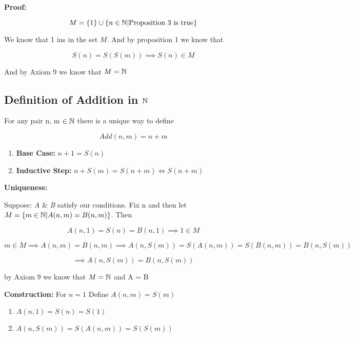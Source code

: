 \textbf{Proof:}

\[
	M = \{1\} \cup\{n \in \mathbb{N} | \text{Proposition 3 is true}\}
\]

We know that 1 ins in the set \(M\). And by proposition 1 we know that

\[
	S(n) = S(S(m)) \implies S(n) \in M
\]

And by Axiom 9 we know that \(M = \mathbb{N}\)

\subsection{Definition of Addition in \texorpdfstring{\(\mathbb{N}\)}{}}

For any pair n, m \(\in \mathbb{N}\) there is a unique way to define

\[
	Add(n , m) = n + m
\]

\begin{enumerate}
	
	\item \textbf{Base Case:} \(n + 1 = S(n)\)

	\item \textbf{Inductive Step:} \(n + S(m) = S(n + m) \iff S(n + m)\)

\end{enumerate}

\textbf{Uniqueness:} 
\vspace{\baselineskip}

Suppose: \textit{A} \& \textit{B} satisfy our conditions. Fix n and then let \(M = \{ m \in \mathbb{N} | 
A(n,m) = B(n, m)\}\). Then

\[
	A(n,1) = S(n) = B(n,1) \implies 1 \in M
\]

\[
	m \in M \implies A(n, m) = B(n, m) \implies A(n, S(m)) = S(A(n, m)) = S(B(n, m)) = B(n, S(m))
\]

\[
	\implies A(n , S(m)) = B(n, S(m))
\]

by Axiom 9 we know that \(M = \mathbb{N}\) and A = B

\textbf{Construction:} For \(n = 1\) Define \(A(n, m) = S(m)\)

\begin{enumerate}
	
	\item \(A(n, 1) = S(n) = S(1)\)
	
	\item \(A(n, S(m)) = S(A(n, m)) = S(S(m))\)

\end{enumerate}

